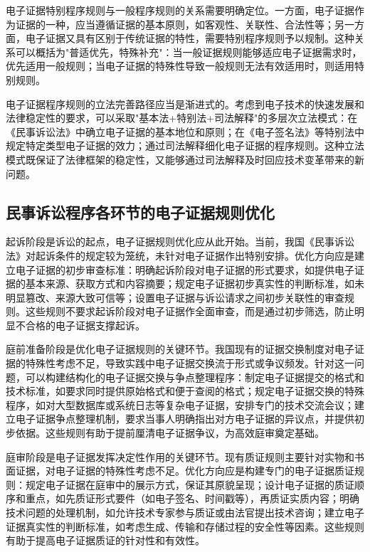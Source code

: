 电子证据特别程序规则与一般程序规则的关系需要明确定位。一方面，电子证据作为证据的一种，应当遵循证据的基本原则，如客观性、关联性、合法性等；另一方面，电子证据又具有区别于传统证据的特性，需要特别程序规则予以规制。这种关系可以概括为"普适优先，特殊补充"：当一般证据规则能够适应电子证据需求时，优先适用一般规则；当电子证据的特殊性导致一般规则无法有效适用时，则适用特别规则。

电子证据程序规则的立法完善路径应当是渐进式的。考虑到电子技术的快速发展和法律稳定性的要求，可以采取"基本法+特别法+司法解释"的多层次立法模式：在《民事诉讼法》中确立电子证据的基本地位和原则；在《电子签名法》等特别法中规定特定类型电子证据的效力；通过司法解释细化电子证据的程序规则。这种立法模式既保证了法律框架的稳定性，又能够通过司法解释及时回应技术变革带来的新问题。

\subsection{民事诉讼程序各环节的电子证据规则优化}

起诉阶段是诉讼的起点，电子证据规则优化应从此开始。当前，我国《民事诉讼法》对起诉条件的规定较为笼统，未针对电子证据作出特别安排。优化方向应是建立电子证据的初步审查标准：明确起诉阶段对电子证据的形式要求，如提供电子证据的基本来源、获取方式和内容摘要；规定电子证据初步真实性的判断标准，如未明显篡改、来源大致可信等；设置电子证据与诉讼请求之间初步关联性的审查规则。这些规则不要求起诉阶段对电子证据作全面审查，而是通过初步筛选，防止明显不合格的电子证据支撑起诉。

庭前准备阶段是优化电子证据规则的关键环节。我国现有的证据交换制度对电子证据的特殊性考虑不足，导致实践中电子证据交换流于形式或争议频发。针对这一问题，可以构建结构化的电子证据交换与争点整理程序：制定电子证据提交的格式和技术标准，如要求同时提供原始格式和便于查阅的格式；规定电子证据交换的特殊程序，如对大型数据库或系统日志等复杂电子证据，安排专门的技术交流会议；建立电子证据争点整理机制，要求当事人明确指出对方电子证据的异议点，并提供初步依据。这些规则有助于提前厘清电子证据争议，为高效庭审奠定基础。

庭审阶段是电子证据发挥决定性作用的关键环节。现有质证规则主要针对实物和书面证据，对电子证据的特殊性考虑不足。优化方向应是构建专门的电子证据质证规则：规定电子证据在庭审中的展示方式，保证其原貌呈现；设计电子证据的质证顺序和重点，如先质证形式要件（如电子签名、时间戳等），再质证实质内容；明确技术问题的处理机制，如允许技术专家参与质证或由法官提出技术咨询；建立电子证据真实性的判断标准，如考虑生成、传输和存储过程的安全性等因素。这些规则有助于提高电子证据质证的针对性和有效性。

